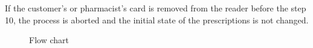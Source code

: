  If the customer's or pharmacist's card is removed from the reader before the step 10, the process is aborted and the initial state of the prescriptions is not changed.
\newpage
{}
\fboxsep=5mm%

\begin{figure}
    \centering
    \hspace*{-0.4in}
    \caption{Flow chart}
    \label{fig:flowchart}
\end{figure} 

\setcounter{page}{100}

